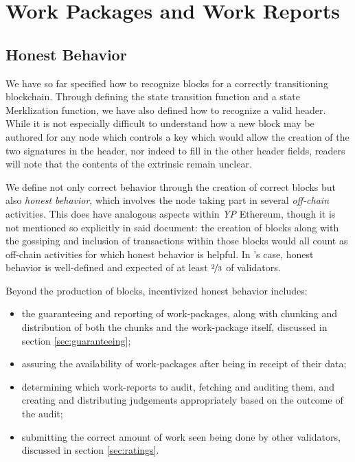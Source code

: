 \section{Work Packages and Work Reports}\label{sec:workpackagesandworkreports}

\subsection{Honest Behavior}

We have so far specified how to recognize blocks for a correctly transitioning \Jam blockchain. Through defining the state transition function and a state Merklization function, we have also defined how to recognize a valid header. While it is not especially difficult to understand how a new block may be authored for any node which controls a key which would allow the creation of the two signatures in the header, nor indeed to fill in the other header fields, readers will note that the contents of the extrinsic remain unclear.

We define not only correct behavior through the creation of correct blocks but also \emph{honest behavior}, which involves the node taking part in several \emph{off-chain} activities. This does have analogous aspects within \emph{YP} Ethereum, though it is not mentioned so explicitly in said document: the creation of blocks along with the gossiping and inclusion of transactions within those blocks would all count as off-chain activities for which honest behavior is helpful. In \Jam's case, honest behavior is well-defined and expected of at least $\nicefrac{2}{3}$ of validators.

Beyond the production of blocks, incentivized honest behavior includes:
\begin{itemize}
    \item the guaranteeing and reporting of work-packages, along with chunking and distribution of both the chunks and the work-package itself, discussed in section \ref{sec:guaranteeing};
    \item assuring the availability of work-packages after being in receipt of their data;
    \item determining which work-reports to audit, fetching and auditing them, and creating and distributing judgements appropriately based on the outcome of the audit;
    \item submitting the correct amount of work seen being done by other validators, discussed in section \ref{sec:ratings}.
\end{itemize}

